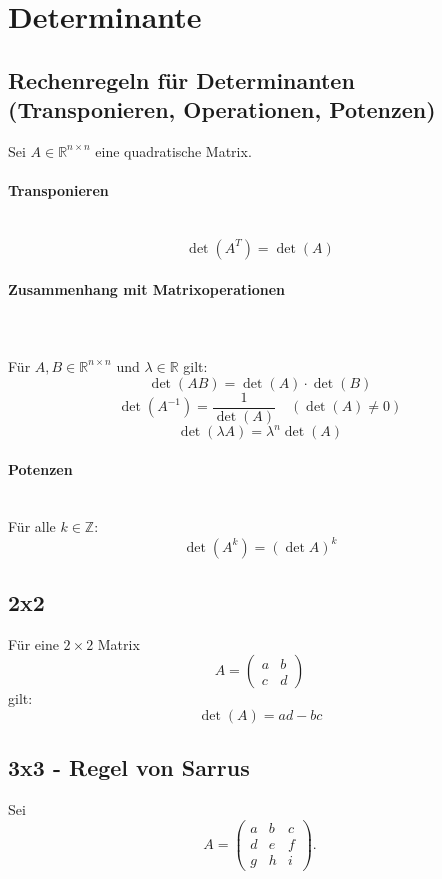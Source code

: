 \documentclass[9pt,a4paper]{article}
\begin{document}
    \section{Determinante}
    \subsection{Rechenregeln für Determinanten (Transponieren, Operationen, Potenzen)}
    
    Sei $A\in\mathbb{R}^{n\times n}$ eine quadratische Matrix.
    
    \paragraph{Transponieren}\mbox{}\\
    \[
    \det(A^T)=\det(A)
    \]
    
    \paragraph{Zusammenhang mit Matrixoperationen}\mbox{}\\
    \\
    Für $A,B\in\mathbb{R}^{n\times n}$ und $\lambda\in\mathbb{R}$ gilt:
    \[
    \det(AB)=\det(A)\cdot\det(B)
    \]
    \[
    \det(A^{-1})=\frac{1}{\det(A)} \quad (\det(A)\neq 0)
    \]
    \[
    \det(\lambda A)=\lambda^{n}\det(A)
    \]
    
    \paragraph{Potenzen}\mbox{}\\
    Für alle $k\in\mathbb{Z}$:
    \[
    \det(A^{k})=(\det A)^{k}
    \]
    
    \subsection{2x2}
    Für eine $2\times2$ Matrix
    \[
    A=
    \begin{pmatrix}
        a & b\\
        c & d
    \end{pmatrix}
    \]
    gilt:
    \[
    \det(A)=ad-bc
    \]
    
    \subsection{3x3 - Regel von Sarrus}
    Sei
    \[
    A =
    \begin{pmatrix}
        a & b & c\\
        d & e & f\\
        g & h & i
    \end{pmatrix}.
    \]
    
\end{document}
